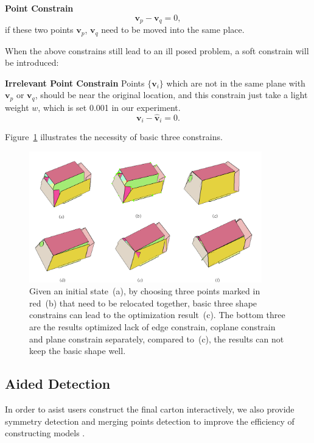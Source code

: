 \documentclass[submission]{gmp2018}
\begin{document}
\noindent
\textbf{Point Constrain} 
\begin{equation}
\mathbf{v}_p - \mathbf{v}_q = 0,
\label{equ:point}
\end{equation}
if these two points $\mathbf{v}_p$, $\mathbf{v}_q$ need to be moved into the same place.

When the above constrains still lead to an ill posed problem, a soft constrain will be introduced:

\noindent
\textbf{Irrelevant Point Constrain} Points $\{\mathbf{v}_i\}$ which are not in the same plane with $\mathbf{v}_p$ or $\mathbf{v}_q$, should be near the original location, and this constrain just take a light weight $w$, which is set 0.001 in our experiment. 
\begin{equation}
\mathbf{v}_i - \mathbf{\hat{v}}_i = 0.
\label{equ:irrelevant}
\end{equation}

Figure~\ref{fig:constrain} illustrates the necessity of basic three constrains.

\begin{figure}
	\centering
	\includegraphics[width=0.9\textwidth]{images/constrain.jpg}
	\caption{Given an initial state~(a), by choosing three points marked in red~(b) that need to be relocated together, basic three shape constrains can lead to the optimization result~(c). The bottom three are the results optimized lack of edge constrain, coplane constrain and plane constrain separately, compared to~(c), the results can not keep the basic shape well.}
	\label{fig:constrain}
\end{figure}


\subsection{Aided Detection}
In order to asist users construct the final carton interactively, we also provide symmetry detection and merging points detection to improve the efficiency of constructing models .
\end{document}

